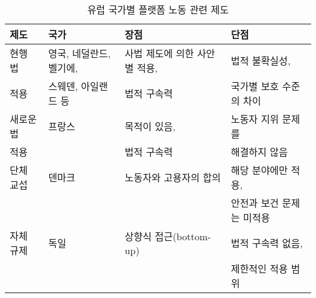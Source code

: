 \begin{itemize}
		\begin{table}[htp]
		\caption{유럽 국가별 플랫폼 노동 관련 제도}
		\begin{center}
		\begin{tabular}{llll}
		\toprule
		 제도 & 국가 & 장점 & 단점 \\
		\midrule
		 현행 법 & 영국, 네덜란드, 벨기에,   & 사법 제도에 의한 사안 별 적용,  & 법적 불확실성, \\
		 적용 & 스웨덴, 아일랜드 등 & 법적 구속력 & 국가별 보호 수준의 차이 \\
		\midrule
		 새로운 법 & 프랑스 & 목적이 있음, & 노동자 지위 문제를 \\
		적용 & & 법적 구속력 & 해결하지 않음 \\
		\midrule
		 단체 교섭 & 덴마크 & 노동자와 고용자의 합의 & 해당 분야에만 적용, \\
		 & & & 안전과 보건 문제는 미적용 \\
		\midrule
		 자체 규제 & 독일 & 상향식 접근(bottom-up) & 법적 구속력 없음, \\
		 & & & 제한적인 적용 범위 \\
		\bottomrule
		\end{tabular}
		\end{center}
		\label{tab:nationalresponsestoplatformwork}
		\end{table}%
	

\end{itemize}
